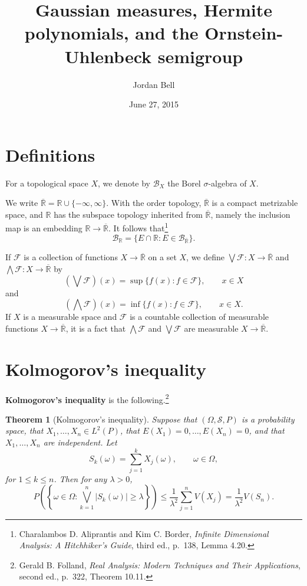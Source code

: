 \documentclass{article}
\newtheorem{theorem}{Theorem}
\theoremstyle{definition}
\begin{document}
\title{Gaussian measures, Hermite polynomials, and the Ornstein-Uhlenbeck semigroup}
\author{Jordan Bell}
\date{June 27, 2015}

\maketitle

\section{Definitions}
For a topological space $X$, we denote by $\mathscr{B}_X$ the Borel $\sigma$-algebra of $X$.

We write $\overline{\mathbb{R}}  = \mathbb{R} \cup\{-\infty,\infty\}$. With the order topology, $\overline{\mathbb{R}}$ is a compact metrizable
space, and $\mathbb{R}$ has the subspace topology inherited from $\overline{\mathbb{R}}$, namely the inclusion map
is an embedding $\mathbb{R} \to \overline{\mathbb{R}}$. It follows that\footnote{Charalambos D. Aliprantis
and Kim C. Border, {\em Infinite Dimensional Analysis: A Hitchhiker's Guide}, third ed., p.~138, Lemma 4.20.}
\[
\mathscr{B}_{\mathbb{R}} = \{E \cap \mathbb{R}: E \in \mathscr{B}_{\overline{\mathbb{R}}}\}.
\]

If $\mathscr{F}$ is a collection of functions $X \to \overline{\mathbb{R}}$ on a  set $X$, we define $\bigvee \mathscr{F}:X \to \overline{\mathbb{R}}$
and $\bigwedge \mathscr{F}:X \to \overline{\mathbb{R}}$ by
\[
\left(\bigvee \mathscr{F} \right)(x) = \sup\{f(x): f \in \mathscr{F}\}, \qquad x \in X
\]
and
\[
\left(\bigwedge \mathscr{F} \right)(x) = \inf\{f(x): f \in \mathscr{F}\}, \qquad x \in X.
\]
If $X$ is a measurable space and $\mathscr{F}$ is a countable collection of measurable functions $X \to \overline{\mathbb{R}}$,
it is a fact that $\bigwedge \mathscr{F}$ and $\bigvee \mathscr{F}$ are measurable $X \to \overline{\mathbb{R}}$. 




\section{Kolmogorov's inequality}
\textbf{Kolmogorov's inequality} is the following.\footnote{Gerald B. Folland, {\em Real Analysis: Modern Techniques and Their
Applications}, second ed., p.~322, Theorem 10.11.}

\begin{theorem}[Kolmogorov's inequality]
Suppose that $(\Omega,\mathscr{S},P)$ is a probability space, that
$X_1,\ldots,X_n \in L^2(P)$, that $E(X_1)=0,\ldots,E(X_n)=0$, and that
$X_1,\ldots,X_n$ are independent. Let
\[
S_k(\omega) = \sum_{j=1}^k X_j(\omega), \qquad \omega \in \Omega,
\]
for $1 \leq k \leq n$. Then for any $\lambda>0$,
\[
P\left(\left\{\omega \in \Omega: \bigvee_{k=1}^n |S_k(\omega)| \geq \lambda \right\}\right) \leq \frac{1}{\lambda^2} \sum_{j=1}^n V(X_j)
=\frac{1}{\lambda^2} V(S_n).
\]
\end{theorem}
\end{document}
